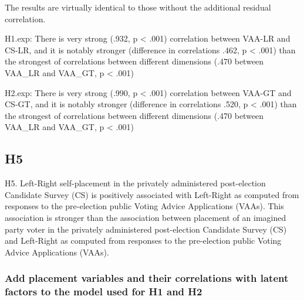 \documentclass[
]{article}
\begin{document}
The results are virtually identical to those without the additional
residual correlation.

H1.exp: There is very strong (.932, p \textless{} .001) correlation
between VAA-LR and CS-LR, and it is notably stronger (difference in
correlations .462, p \textless{} .001) than the strongest of
correlations between different dimensions (.470 between VAA\_LR and
VAA\_GT, p \textless{} .001)

H2.exp: There is very strong (.990, p \textless{} .001) correlation
between VAA-GT and CS-GT, and it is notably stronger (difference in
correlations .520, p \textless{} .001) than the strongest of
correlations between different dimensions (.470 between VAA\_LR and
VAA\_GT, p \textless{} .001)

\newpage

\hypertarget{h5}{%
\subsection{H5}\label{h5}}

H5. Left-Right self-placement in the privately administered
post-election Candidate Survey (CS) is positively associated with
Left-Right as computed from responses to the pre-election public Voting
Advice Applications (VAAs). This association is stronger than the
association between placement of an imagined party voter in the
privately administered post-election Candidate Survey (CS) and
Left-Right as computed from responses to the pre-election public Voting
Advice Applications (VAAs).

\hypertarget{add-placement-variables-and-their-correlations-with-latent-factors-to-the-model-used-for-h1-and-h2}{%
\subsubsection{Add placement variables and their correlations with
latent factors to the model used for H1 and
H2}\label{add-placement-variables-and-their-correlations-with-latent-factors-to-the-model-used-for-h1-and-h2}}
\end{document}
